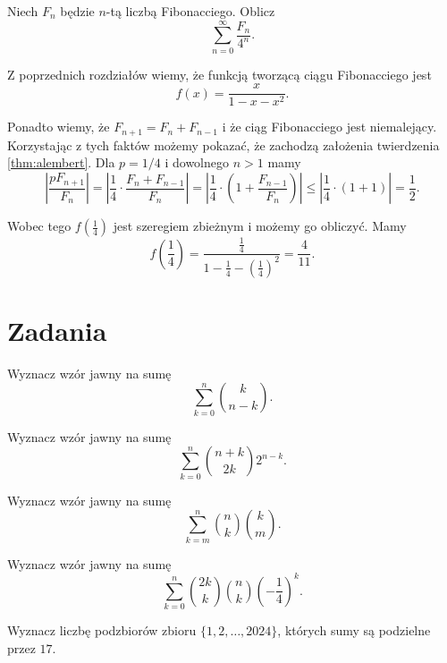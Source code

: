 \documentclass[shortabstract]{imthesis}
\begin{document}
\begin{problem} \label{problem:fibo1/4}
Niech $F_n$ będzie $n$-tą liczbą Fibonacciego. Oblicz
$$
\sum_{n=0}^\infty \frac{F_n}{4^n}.
$$
\end{problem}
\begin{solution} 
Z poprzednich rozdziałów wiemy, że funkcją tworzącą ciągu Fibonacciego jest
$$
f(x) = \frac{x}{1-x-x^2}.
$$

Ponadto wiemy, że $F_{n+1} = F_n+F_{n-1}$ i że ciąg Fibonacciego jest niemalejący. Korzystając z tych faktów możemy pokazać, że zachodzą założenia twierdzenia \ref{thm:alembert}. Dla $p = 1/4$ i dowolnego $n > 1$ mamy
$$
\left|\frac{pF_{n+1}}{F_n}\right| =\left|\frac14 \cdot \frac{F_n + F_{n-1}}{F_n}\right| = \left|\frac14 \cdot \left(1 + \frac{F_{n-1}}{F_n}\right)\right| \leq \left|\frac14 \cdot \left(1 + 1\right)\right| = \frac12.
$$

Wobec tego $f\left(\frac14\right)$ jest szeregiem zbieżnym i możemy go obliczyć. Mamy
$$
f\left(\frac14\right) = \frac{\frac14}{1-\frac14-\left(\frac14\right)^2} = \frac{4}{11}.
$$
\end{solution}

\newpage
\section{Zadania}
\begin{problem} \label{problem:snake1}
    Wyznacz wzór jawny na sumę
    $$
    \sum_{k=0}^n {k \choose n-k}.
    $$
\end{problem}
\begin{problem} \label{problem:snake2}
    Wyznacz wzór jawny na sumę
    $$
    \sum_{k=0}^n {n+k \choose 2k} 2^{n-k}.
    $$
\end{problem}
\begin{problem} \label{problem:snake3}
    Wyznacz wzór jawny na sumę
    $$
    \sum_{k=m}^n {n \choose k}{k \choose m}.
    $$
\end{problem}
\begin{problem} \label{problem:snake4}
    Wyznacz wzór jawny na sumę
    $$
    \sum_{k=0}^n {2k \choose k}{n \choose k} \left(-\frac14\right)^k.
    $$
\end{problem}

\begin{problem} \label{problem:subsets17}
Wyznacz liczbę podzbiorów zbioru $\{1, 2, \ldots, 2024\}$, których sumy są podzielne przez $17$.
\end{problem}
\end{document}
